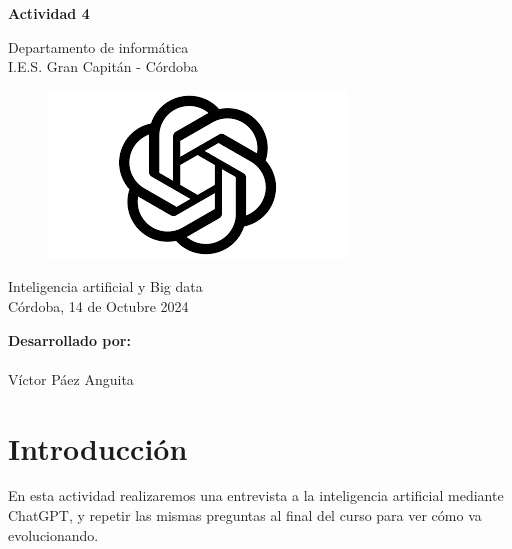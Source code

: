 \documentclass[12pt]{article}
\begin{document}
\begin{titlepage}
    \begin{center}
      \Large \bfseries{}
    \end{center}
    \vspace{0.1cm}
    \begin{center}
      \Large \bfseries{}
    \end{center}
    \vspace{0.1cm}
    \begin{center}
     \Large \bfseries{Actividad 4}
    \end{center}
    \vspace{0.0001cm}
    \begin{center}
        Departamento de informática \\ I.E.S. Gran Capitán - Córdoba
    \end{center}
        \vspace{2 cm}
\begin{figure}[h!]
    \centering
    \includegraphics[width=.8\textwidth]{images.png}
    \label{fig:my_label}
\end{figure}
    \vspace{0.2 cm}
    \begin{center}
        Inteligencia artificial y Big data \\ Córdoba, 14 de Octubre 2024
    \end{center}
    \vspace{4 cm}
\null\hfill \textbf{Desarrollado por:}
\\
\\
\null\hfill Víctor Páez Anguita
\clearpage
\end{titlepage}

\tableofcontents
\clearpage

\section{Introducción}
En esta actividad realizaremos una entrevista a la inteligencia artificial mediante ChatGPT, y repetir las mismas preguntas al final del curso para ver cómo va evolucionando.
\end{document}

